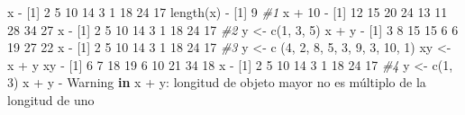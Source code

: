 \documentclass[
]{book}
\newenvironment{Shaded}{\begin{snugshade}}{\end{snugshade}}
\newcommand{\CommentTok}[1]{\textcolor[rgb]{0.56,0.35,0.01}{\textit{#1}}}
\newcommand{\ControlFlowTok}[1]{\textcolor[rgb]{0.13,0.29,0.53}{\textbf{#1}}}
\newcommand{\DecValTok}[1]{\textcolor[rgb]{0.00,0.00,0.81}{#1}}
\newcommand{\FunctionTok}[1]{\textcolor[rgb]{0.00,0.00,0.00}{#1}}
\newcommand{\NormalTok}[1]{#1}
\newcommand{\OtherTok}[1]{\textcolor[rgb]{0.56,0.35,0.01}{#1}}
\newcommand{\SpecialCharTok}[1]{\textcolor[rgb]{0.00,0.00,0.00}{#1}}
\begin{document}
\begin{Shaded}
\begin{Highlighting}[]
\NormalTok{x}
\SpecialCharTok{{-}}\NormalTok{ [}\DecValTok{1}\NormalTok{]  }\DecValTok{2}  \DecValTok{5} \DecValTok{10} \DecValTok{14}  \DecValTok{3}  \DecValTok{1} \DecValTok{18} \DecValTok{24} \DecValTok{17}
\FunctionTok{length}\NormalTok{(x)}
\SpecialCharTok{{-}}\NormalTok{ [}\DecValTok{1}\NormalTok{] }\DecValTok{9}
\CommentTok{\#1}
\NormalTok{x }\SpecialCharTok{+} \DecValTok{10}
\SpecialCharTok{{-}}\NormalTok{ [}\DecValTok{1}\NormalTok{] }\DecValTok{12} \DecValTok{15} \DecValTok{20} \DecValTok{24} \DecValTok{13} \DecValTok{11} \DecValTok{28} \DecValTok{34} \DecValTok{27}
\NormalTok{x}
\SpecialCharTok{{-}}\NormalTok{ [}\DecValTok{1}\NormalTok{]  }\DecValTok{2}  \DecValTok{5} \DecValTok{10} \DecValTok{14}  \DecValTok{3}  \DecValTok{1} \DecValTok{18} \DecValTok{24} \DecValTok{17}
\CommentTok{\#2}
\NormalTok{y }\OtherTok{\textless{}{-}} \FunctionTok{c}\NormalTok{(}\DecValTok{1}\NormalTok{, }\DecValTok{3}\NormalTok{, }\DecValTok{5}\NormalTok{)}
\NormalTok{x }\SpecialCharTok{+}\NormalTok{ y}
\SpecialCharTok{{-}}\NormalTok{ [}\DecValTok{1}\NormalTok{]  }\DecValTok{3}  \DecValTok{8} \DecValTok{15} \DecValTok{15}  \DecValTok{6}  \DecValTok{6} \DecValTok{19} \DecValTok{27} \DecValTok{22}
\NormalTok{x}
\SpecialCharTok{{-}}\NormalTok{ [}\DecValTok{1}\NormalTok{]  }\DecValTok{2}  \DecValTok{5} \DecValTok{10} \DecValTok{14}  \DecValTok{3}  \DecValTok{1} \DecValTok{18} \DecValTok{24} \DecValTok{17}
\CommentTok{\#3}
\NormalTok{y }\OtherTok{\textless{}{-}} \FunctionTok{c}\NormalTok{ (}\DecValTok{4}\NormalTok{, }\DecValTok{2}\NormalTok{, }\DecValTok{8}\NormalTok{, }\DecValTok{5}\NormalTok{, }\DecValTok{3}\NormalTok{, }\DecValTok{9}\NormalTok{, }\DecValTok{3}\NormalTok{, }\DecValTok{10}\NormalTok{, }\DecValTok{1}\NormalTok{)}
\NormalTok{xy }\OtherTok{\textless{}{-}}\NormalTok{ x }\SpecialCharTok{+}\NormalTok{ y}
\NormalTok{xy}
\SpecialCharTok{{-}}\NormalTok{ [}\DecValTok{1}\NormalTok{]  }\DecValTok{6}  \DecValTok{7} \DecValTok{18} \DecValTok{19}  \DecValTok{6} \DecValTok{10} \DecValTok{21} \DecValTok{34} \DecValTok{18}
\NormalTok{x}
\SpecialCharTok{{-}}\NormalTok{ [}\DecValTok{1}\NormalTok{]  }\DecValTok{2}  \DecValTok{5} \DecValTok{10} \DecValTok{14}  \DecValTok{3}  \DecValTok{1} \DecValTok{18} \DecValTok{24} \DecValTok{17}
\CommentTok{\#4}
\NormalTok{y }\OtherTok{\textless{}{-}} \FunctionTok{c}\NormalTok{(}\DecValTok{1}\NormalTok{, }\DecValTok{3}\NormalTok{)}
\NormalTok{x }\SpecialCharTok{+}\NormalTok{ y}
\SpecialCharTok{{-}}\NormalTok{ Warning }\ControlFlowTok{in}\NormalTok{ x }\SpecialCharTok{+}\NormalTok{ y}\SpecialCharTok{:}\NormalTok{ longitud de objeto mayor no es múltiplo de la longitud de uno}

\end{Highlighting}
\end{Shaded}
\end{document}
